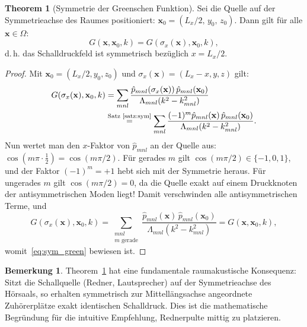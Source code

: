 ﻿\documentclass[12pt, a4paper]{article}
\theoremstyle{definition}
\newtheorem{bemerkung}{Bemerkung}[section]
\newtheorem{theorem}{Theorem}[section]
\theoremstyle{remark}
\newcommand{\Lx}{L_x}
\begin{document}
\begin{theorem}[Symmetrie der Greenschen Funktion]
\label{thm:sym_green}
Sei die Quelle auf der Symmetrieachse des Raumes positioniert:
$\mathbf{x}_0 = (\Lx/2,\, y_0,\, z_0)$.
Dann gilt für alle $\mathbf{x} \in \Omega$:
\begin{equation}
  G(\mathbf{x},\mathbf{x}_0,k) = G(\sigma_x(\mathbf{x}),\mathbf{x}_0,k),
  \label{eq:sym_green}
\end{equation}
d.\,h. das Schalldruckfeld ist symmetrisch bezüglich $x = \Lx/2$.
\end{theorem}

\begin{proof}
Mit $\mathbf{x}_0 = (\Lx/2, y_0, z_0)$ und $\sigma_x(\mathbf{x}) = (\Lx-x, y, z)$ gilt:
\begin{align*}
  G(\sigma_x(\mathbf{x}),\mathbf{x}_0,k)
  &= \sum_{mnl} \frac{\hat{p}_{mnl}(\sigma_x(\mathbf{x}))\,\hat{p}_{mnl}(\mathbf{x}_0)}
                    {\Lambda_{mnl}(k^2-k_{mnl}^2)} \\
  &\overset{\text{Satz~\ref{satz:sym}}}{=}
    \sum_{mnl} \frac{(-1)^m \hat{p}_{mnl}(\mathbf{x})\,\hat{p}_{mnl}(\mathbf{x}_0)}
                    {\Lambda_{mnl}(k^2-k_{mnl}^2)}.
\end{align*}
Nun wertet man den $x$-Faktor von $\hat{p}_{mnl}$ an der Quelle aus:
$\cos(m\pi \cdot \frac{1}{2}) = \cos(m\pi/2)$.
Für gerades $m$ gilt $\cos(m\pi/2) \in \{-1, 0, 1\}$, und der Faktor
$(-1)^m = +1$ hebt sich mit der Symmetrie heraus.
Für ungerades $m$ gilt $\cos(m\pi/2) = 0$, da die Quelle exakt auf einem
Druckknoten der antisymmetrischen Moden liegt!
Damit verschwinden alle antisymmetrischen Terme, und
\[
  G(\sigma_x(\mathbf{x}),\mathbf{x}_0,k)
  = \sum_{\substack{mnl \\ m \text{ gerade}}}
    \frac{\hat{p}_{mnl}(\mathbf{x})\,\hat{p}_{mnl}(\mathbf{x}_0)}{\Lambda_{mnl}(k^2-k_{mnl}^2)}
  = G(\mathbf{x},\mathbf{x}_0,k),
\]
womit~\eqref{eq:sym_green} bewiesen ist. 
\end{proof}

\begin{bemerkung}
Theorem~\ref{thm:sym_green} hat eine fundamentale raumakustische Konsequenz:
Sitzt die Schallquelle (Redner, Lautsprecher) auf der Symmetrieachse des Hörsaals,
so erhalten symmetrisch zur Mittellängsachse angeordnete Zuhörerplätze exakt
identischen Schalldruck. Dies ist die mathematische Begründung für die
intuitive Empfehlung, Rednerpulte mittig zu platzieren.
\end{bemerkung}
\end{document}
